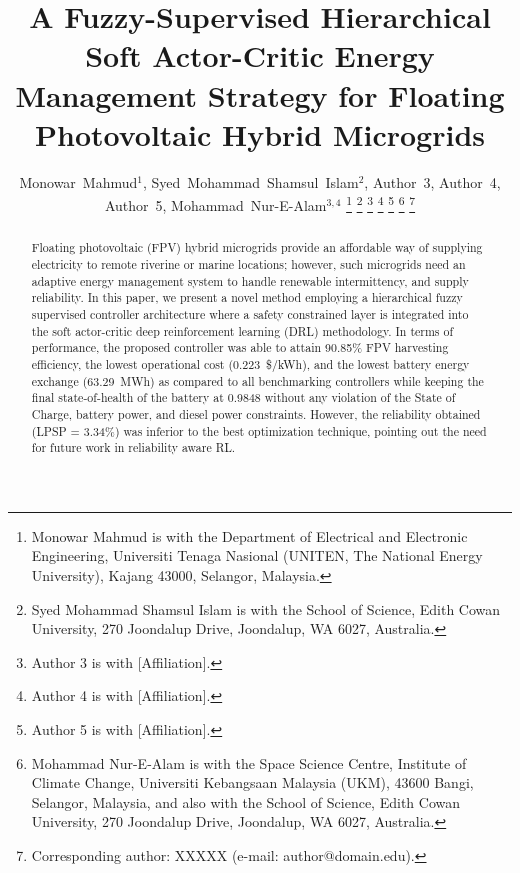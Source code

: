 \documentclass[journal]{IEEEtran}
\begin{document}
\title{A Fuzzy-Supervised Hierarchical Soft Actor-Critic Energy Management Strategy for Floating Photovoltaic Hybrid Microgrids}


\author{%
Monowar~Mahmud$^{1}$,
Syed~Mohammad~Shamsul~Islam$^{2}$,
Author~3,
Author~4,
Author~5,
Mohammad~Nur-E-Alam$^{3,4}$%
%
\thanks{Monowar Mahmud is with the Department of Electrical and Electronic Engineering, Universiti Tenaga Nasional (UNITEN, The National Energy University), Kajang 43000, Selangor, Malaysia.}
%
\thanks{Syed Mohammad Shamsul Islam is with the School of Science, Edith Cowan University, 270 Joondalup Drive, Joondalup, WA 6027, Australia.}
%
\thanks{Author 3 is with [Affiliation].}
%
\thanks{Author 4 is with [Affiliation].}
%
\thanks{Author 5 is with [Affiliation].}
%
\thanks{Mohammad Nur-E-Alam is with the Space Science Centre, Institute of Climate Change, Universiti Kebangsaan Malaysia (UKM), 43600 Bangi, Selangor, Malaysia, and also with the School of Science, Edith Cowan University, 270 Joondalup Drive, Joondalup, WA 6027, Australia.}
%
\thanks{Corresponding author: XXXXX (e-mail: author@domain.edu).} %
}

\maketitle

\begin{abstract}
Floating photovoltaic (FPV) hybrid microgrids provide an affordable way of supplying electricity to remote riverine or marine locations; however, such microgrids need an adaptive energy management system to handle renewable intermittency, and supply reliability. In this paper, we present a novel method employing a hierarchical fuzzy supervised controller architecture where a safety constrained layer is integrated into the soft actor-critic deep reinforcement learning (DRL) methodology. In terms of performance, the proposed controller was able to attain 90.85\% FPV harvesting efficiency, the lowest operational cost (0.223~\$/kWh), and the lowest battery energy exchange (63.29~MWh) as compared to all benchmarking controllers while keeping the final state-of-health of the battery at 0.9848 without any violation of the State of Charge, battery power, and diesel power constraints. However, the reliability obtained (LPSP = 3.34\%) was inferior to the best optimization technique, pointing out the need for future work in reliability aware RL.
\end{abstract}
\end{document}
